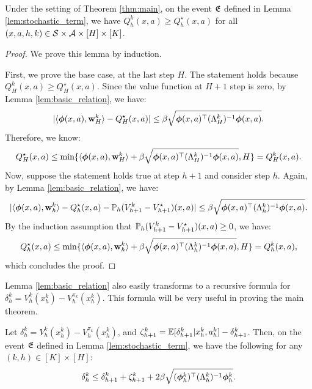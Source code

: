 \begin{lemma}[UCB] \label{lem:UCB}
Under the setting of Theorem \ref{thm:main}, on the event $\fE$ defined in Lemma \ref{lem:stochastic_term}, we have $Q^k_h(x, a) \ge Q^\star_h(x, a)$ for all $(x, a, h, k) \in \cS\times\cA\times[H]\times[K]$.
\end{lemma}

\begin{proof}
We prove this lemma by induction. 

First, we prove the base case, at the last step $H$.  The statement holds because $Q^k_H(x, a) \ge Q^\star_H(x, a)$. Since the value function at $H+1$ step is zero, by Lemma \ref{lem:basic_relation}, we have:
\begin{equation*}
|\la\bphi(x, a), \w^k_H\ra - Q_H^\star(x, a)| \le \beta \sqrt{\bphi(x, a)\trans (\Lambda^k_H)^{-1}  \bphi(x, a)}.
\end{equation*}
Therefore, we know:
\begin{equation*}
Q_H^\star(x, a) \le \min\{\la\bphi(x, a), \w^k_H\ra + \beta\sqrt{\bphi(x, a)\trans (\Lambda^k_H)^{-1}  \bphi(x, a)}, H\} = Q^k_H(x, a).
\end{equation*}
Now, suppose the statement holds true at step $h+1$ and consider step $h$. Again, by Lemma \ref{lem:basic_relation}, we have:
\begin{equation*}
|\la\bphi(x, a), \w^k_h\ra - Q_h^\star(x, a) -  \P_h (V^{k}_{h+1} - V^{\star}_{h+1})(x, a)| \le \beta \sqrt{\bphi(x, a)\trans (\Lambda^k_h)^{-1}  \bphi(x, a)}.
\end{equation*}
By the induction assumption that $\P_h (V^{k}_{h+1} - V^{\star}_{h+1})(x, a) \ge 0$, we have:
\begin{equation*}
Q_h^\star(x, a) \le \min\{\la\bphi(x, a), \w^k_h\ra + \beta\sqrt{\bphi(x, a)\trans (\Lambda^k_h)^{-1}  \bphi(x, a)}, H\} = Q^k_h(x, a),
\end{equation*}
which concludes the proof. 
\end{proof}

Lemma \ref{lem:basic_relation} also easily transforms to a recursive formula for $\delta^k_h = V^k_h(x^{k}_{h}) - V^{\pi_k}_h(x^{k}_{h})$. This formula will be very useful in proving the main theorem.

\begin{lemma}\label{lem:recursive}
Let $\delta^k_h = V^k_h(x^{k}_{h}) - V^{\pi_k}_h(x^{k}_{h})$, and $\zeta^k_{h+1} = 
\E[\delta^k_{h+1}|x^{k}_h, a^{k}_h] - \delta_{h+1}^k$. Then, on the event $\fE$ defined in Lemma \ref{lem:stochastic_term}, we have the following for any $(k, h)\in [K]\times [H]$:
\begin{equation*}
\delta^k_h \le \delta^k_{h+1} + \zeta^k_{h+1} + 2\beta\sqrt{(\bphi^{k}_h)\trans (\Lambda^k_h)^{-1}  \bphi^{k}_h}. 
\end{equation*}
\end{lemma}

